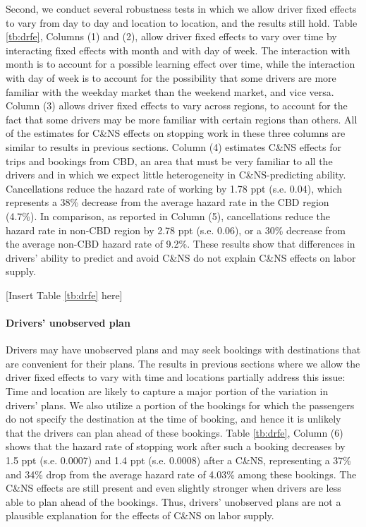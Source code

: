 \documentclass[reviewmode]{restat}
\begin{document}
Second, we conduct several robustness tests in which we allow driver fixed effects to vary from day to day 
and location to location, and the results still hold. Table  \ref{tb:drfe}, Columns (1) and (2), allow driver
fixed effects to vary over time by interacting fixed effects with month and with day of week. The interaction
with month is to account for a possible learning effect over time, while the interaction with day of week is
to account for the possibility that some drivers are more familiar with the weekday market than the weekend
market, and vice versa. Column (3) allows driver fixed effects to vary across regions, to account for the fact 
that some drivers may be more familiar with certain regions than others. All of the estimates for C\&NS effects
on stopping work in these three columns are %
similar to results in previous sections. Column (4) estimates C\&NS effects for trips and bookings from CBD, 
an area that must be very familiar to all the drivers and in which we expect little heterogeneity in
C\&NS-predicting ability. Cancellations reduce the hazard rate of working by 1.78 ppt (s.e. 0.04), which 
represents a 38\% decrease from the average hazard rate in the CBD region (4.7\%). In comparison, as
reported in Column (5), cancellations reduce the hazard rate in non-CBD region by 2.78 ppt (s.e. 0.06), 
or a 30\% decrease from the average non-CBD hazard rate of 9.2\%. These results show that differences in
drivers' ability to predict and avoid C\&NS do not explain C\&NS effects on labor supply.

\begin{center}
    [Insert Table \ref{tb:drfe} here]
\end{center}

\paragraph{Drivers' unobserved plan} Drivers may have unobserved plans and may seek bookings with destinations 
that are convenient for their plans. The results in previous sections where we allow the driver fixed effects
to vary with time and locations partially address this issue: Time and location are likely to capture a major
portion of the variation in drivers' plans. We also utilize a portion of the bookings for which the passengers 
do not specify the destination at the time of booking, and hence it is unlikely that the drivers can plan ahead
of these bookings. Table \ref{tb:drfe}, Column (6) shows that the hazard rate of stopping work after such a 
booking decreases by 1.5 ppt (s.e. 0.0007) and 1.4 ppt (s.e. 0.0008) after a C\&NS, representing a 37\% and
34\% drop from the average hazard rate of 4.03\% among these bookings. The C\&NS effects are still present 
and even slightly stronger when drivers are less able to plan ahead of the bookings. Thus, drivers' unobserved
plans are not a plausible explanation for the effects of C\&NS on labor supply.
\end{document}
